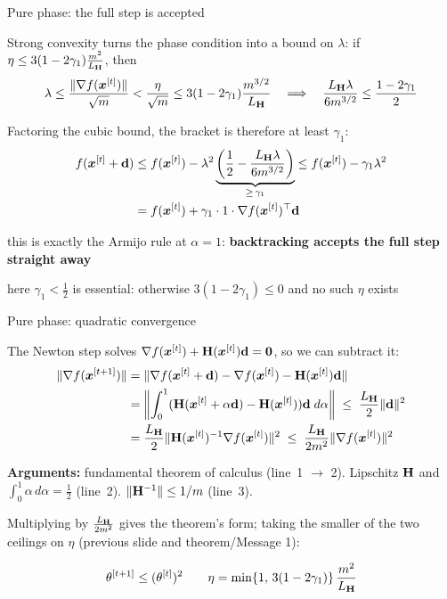 \documentclass[11pt,compress,t,notes=noshow, xcolor=table]{beamer}
\newcommand{\LH}{L_{\H}}
\begin{document}
\begin{framei}[fs=small]{Pure phase: the full step is accepted}
\item Strong convexity turns the phase condition into a bound on $\lambda$: if
$\eta \le 3(1 - 2\gamma_1)\frac{m^2}{\LH}$, then
$$\lambda \le \frac{\|\nabla f(\xv^{[t]})\|}{\sqrt{m}} < \frac{\eta}{\sqrt{m}}
\le 3(1 - 2\gamma_1)\frac{m^{3/2}}{\LH}
\quad \Longrightarrow \quad
\frac{\LH \lambda}{6 m^{3/2}} \le \frac{1 - 2\gamma_1}{2}$$
\item Factoring the cubic bound, the bracket is therefore at least $\gamma_1$:
\begin{align*}
f(\xv^{[t]} + \mathbf{d}) &\le f(\xv^{[t]}) - \lambda^2 \underbrace{\left( \frac{1}{2}
- \frac{\LH \lambda}{6 m^{3/2}} \right)}_{\ge \, \gamma_1}
\le f(\xv^{[t]}) - \gamma_1 \lambda^2 \\
&= f(\xv^{[t]}) + \gamma_1 \cdot 1 \cdot \nabla f(\xv^{[t]})^\top \mathbf{d}
\end{align*}
\item[$\Rightarrow$] this is exactly the Armijo rule at $\alpha = 1$: \textbf{backtracking accepts the full step
straight away}
\item[$\Rightarrow$] here $\gamma_1 < \tfrac{1}{2}$ is essential: otherwise $3(1 - 2\gamma_1) \le 0$ and no
such $\eta$ exists
\end{framei}


\begin{framei}[fs=small]{Pure phase: quadratic convergence}
\item The Newton step solves $\nabla f(\bm{x}^{[t]}) + \mathbf{H}(\bm{x}^{[t]}) \mathbf{d} = \mathbf{0}$, so we can subtract
it:
\begin{align*}
\|\nabla f(\xv^{[t+1]})\| &= \|\nabla f(\xv^{[t]} + \mathbf{d}) - \nabla f(\xv^{[t]}) - \H(\xv^{[t]})\mathbf{d}\| \\
&= \left\| \int_0^1 ( \H(\xv^{[t]} + \alpha \mathbf{d}) - \H(\xv^{[t]}) ) \mathbf{d} \; d\alpha \right\|
\; \le \; \frac{\LH}{2}\|\mathbf{d}\|^2 \\
&= \frac{\LH}{2}\|\H(\xv^{[t]})^{-1} \nabla f(\xv^{[t]})\|^2
\; \le \; \frac{\LH}{2m^2}\|\nabla f(\xv^{[t]})\|^2
\end{align*}
\item \textbf{Arguments:} fundamental theorem of calculus (line~1 $\to$ 2). Lipschitz $\mathbf{H}$ and
$\int_0^1 \alpha \, d\alpha = \tfrac{1}{2}$ (line~2). $\|\mathbf{H}^{-1}\| \le 1/m$ (line~3).
\item Multiplying by $\frac{\LH}{2m^2}$ gives the theorem's form; taking the smaller of the two ceilings
on $\eta$ (previous slide and theorem/Message 1):
\begin{framed}
$$\theta^{[t+1]} \le (\theta^{[t]})^2 \qquad
\eta = \min\{1, \, 3(1 - 2\gamma_1)\} \, \frac{m^2}{\LH}$$
\end{framed}
\end{framei}
\end{document}
